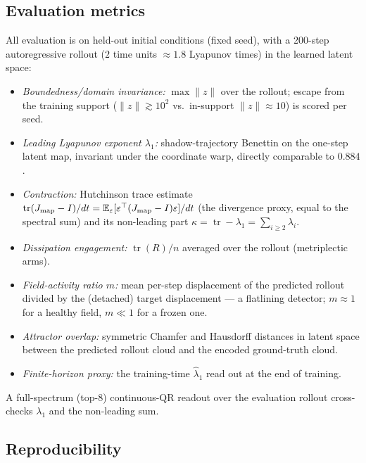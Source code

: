 \documentclass[journal]{IEEEtran}
\newcommand{\E}{\mathbb{E}}
\newcommand{\tr}{\operatorname{tr}}
\begin{document}
\subsection{Evaluation metrics}
\label{sec:methods-eval}

All evaluation is on held-out initial conditions (fixed seed), with a
200-step autoregressive rollout ($2$ time units $\approx1.8$ Lyapunov
times) in the learned latent space:
\begin{itemize}
\item \emph{Boundedness/domain invariance:} $\max\|z\|$ over the rollout;
escape from the training support ($\|z\|\gtrsim10^2$ vs.\ in-support
$\|z\|\approx10$) is scored per seed.
\item \emph{Leading Lyapunov exponent $\lambda_1$:} shadow-trajectory
Benettin on the one-step latent map, invariant under the coordinate
warp, directly comparable to $0.884$.
\item \emph{Contraction:} Hutchinson trace estimate
$\tr(J_{\rm map}-I)/dt=\E_\varepsilon[\varepsilon^\top(J_{\rm map}-I)\varepsilon]/dt$
(the divergence proxy, equal to the spectral sum) and its non-leading
part $\kappa=\tr-\lambda_1=\sum_{i\ge2}\lambda_i$.
\item \emph{Dissipation engagement:} $\tr(R)/n$ averaged over the
rollout (metriplectic arms).
\item \emph{Field-activity ratio $m$:} mean per-step displacement of the
predicted rollout divided by the (detached) target displacement --- a
flatlining detector; $m\approx1$ for a healthy field, $m\ll1$ for a
frozen one.
\item \emph{Attractor overlap:} symmetric Chamfer and Hausdorff
distances in latent space between the predicted rollout cloud and the
encoded ground-truth cloud.
\item \emph{Finite-horizon proxy:} the training-time $\hat\lambda_1$
read out at the end of training.
\end{itemize}
A full-spectrum (top-8) continuous-QR readout over the evaluation
rollout cross-checks $\lambda_1$ and the non-leading sum.

\subsection{Reproducibility}
\label{sec:methods-repro}
\end{document}
